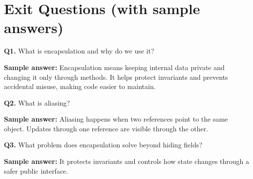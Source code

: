 \documentclass[11pt]{article}
\begin{document}
\section{Exit Questions (with sample answers)}
\textbf{Q1.} What is encapsulation and why do we use it?\par
\textbf{Sample answer:} Encapsulation means keeping internal data private and changing it only through methods. It helps protect invariants and prevents accidental misuse, making code easier to maintain.

\vspace{0.6em}
\textbf{Q2.} What is aliasing?\par
\textbf{Sample answer:} Aliasing happens when two references point to the same object. Updates through one reference are visible through the other.

\vspace{0.6em}
\textbf{Q3.} What problem does encapsulation solve beyond hiding fields?\par
\textbf{Sample answer:} It protects invariants and controls how state changes through a safer public interface.
\end{document}
